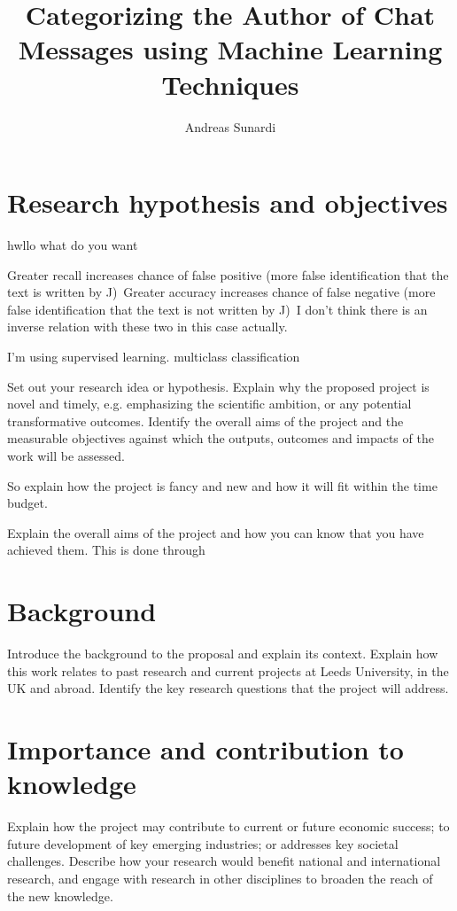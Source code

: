 \documentclass[a4paper, 11pt]{article}
\begin{document}
\title{Categorizing the Author of Chat Messages using Machine Learning Techniques}

\author{Andreas Sunardi}

\date{}
\maketitle

\section{Research hypothesis and objectives}
hwllo what do you want

Greater recall increases chance of false positive (more false identification that the text is written by J)\
Greater accuracy increases chance of false negative (more false identification that the text is not written by J)\
I don't think there is an inverse relation with these two in this case actually.

I'm using supervised learning.
multiclass classification


Set out your research idea or hypothesis. Explain why the proposed project is novel and timely, e.g. emphasizing the scientific ambition, or any potential transformative outcomes. Identify the overall aims of the project and the measurable objectives against which the outputs, outcomes and impacts of the work will be assessed. \cite{smith2021datamining}

So explain how the project is fancy and new and how it will fit within the time budget.

Explain the overall aims of the project and how you can know that you have achieved them. This is done through 

\pagebreak
\section{Background}
Introduce the background to the proposal and explain its context. Explain how this work relates to past research and current projects at Leeds University, in the UK and abroad. Identify the key research questions that the project will address.\cite{smith2021dataminingOther}

\pagebreak
\section{Importance and contribution to knowledge}
Explain how the project may contribute to current or
future economic success; to future development of key emerging industries; or addresses key
societal challenges. Describe how your research would benefit national and international research,
and engage with research in other disciplines to broaden the reach of the new knowledge.
\end{document}
